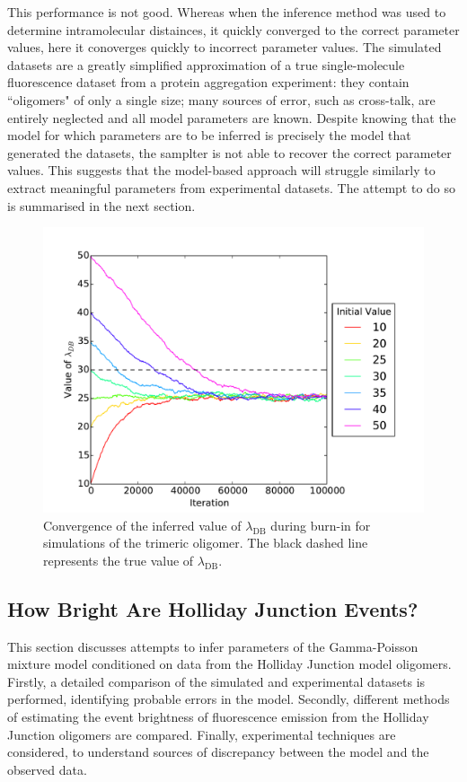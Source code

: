 This performance is not good. Whereas when the inference method was used to determine intramolecular distainces, it quickly converged to the correct parameter values, here it conoverges quickly to incorrect parameter values. The simulated datasets are a greatly simplified approximation of a true single-molecule fluorescence dataset from a protein aggregation experiment: they contain ``oligomers" of only a single size; many sources of error, such as cross-talk, are entirely neglected and all model parameters are known. Despite knowing that the model for which parameters are to be inferred is precisely the model that generated the datasets, the samplter is not able to recover the correct parameter values. This suggests that the model-based approach will struggle similarly to extract meaningful parameters from experimental datasets. The attempt to do so is summarised in the next section.

\begin{figure}
   \begin{center}
      \includegraphics*[clip=true, width=6in]{sizing/Convergence.pdf}
      \caption{Convergence of the inferred value of $\lambda_{\text{DB}}$ during burn-in for simulations of the trimeric oligomer. The black dashed line represents the true value of $\lambda_{\text{DB}}$.}
      \label{fig:convergence}
   \end{center}
\end{figure}

\subsection{How Bright Are Holliday Junction Events?}
This section discusses attempts to infer parameters of the Gamma-Poisson mixture model conditioned on data from the Holliday Junction model oligomers. Firstly, a detailed comparison of the simulated and experimental datasets is performed, identifying probable errors in the model. Secondly, different methods of estimating the event brightness of fluorescence emission from the Holliday Junction oligomers are compared. Finally, experimental techniques are considered, to understand sources of discrepancy between the model and the observed data.

